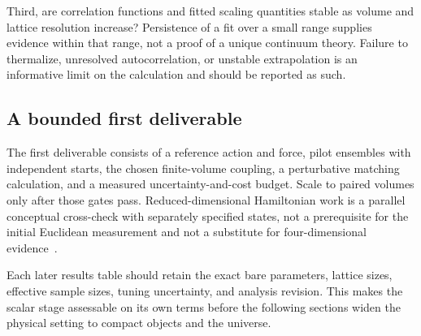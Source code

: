 Third, are correlation functions and fitted scaling quantities stable as volume and lattice resolution increase?  Persistence of a fit over a small range supplies evidence within that range, not a proof of a unique continuum theory.  Failure to thermalize, unresolved autocorrelation, or unstable extrapolation is an informative limit on the calculation and should be reported as such.

\subsection{A bounded first deliverable}

The first deliverable consists of a reference action and force, pilot ensembles with independent starts, the chosen finite-volume coupling, a perturbative matching calculation, and a measured uncertainty-and-cost budget.  Scale to paired volumes only after those gates pass.  Reduced-dimensional Hamiltonian work is a parallel conceptual cross-check with separately specified states, not a prerequisite for the initial Euclidean measurement and not a substitute for four-dimensional evidence~\cite{Holdom:2024Ghosts,Arici:2018}.

Each later results table should retain the exact bare parameters, lattice sizes, effective sample sizes, tuning uncertainty, and analysis revision.  This makes the scalar stage assessable on its own terms before the following sections widen the physical setting to compact objects and the universe.
